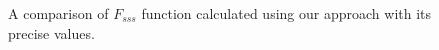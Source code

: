 \documentclass[reprint,amsmath,amssymb,aps,pre,showkeys,showpacs]{revtex4-1}
\begin{document}
\begin{figure}[tp]
{    \label{fig:sss-dumbbell-precise}}
  \hfill
  \caption[]{A comparison of $F_{sss}$ function calculated using our approach
    with its precise values.}
  \label{fig:sss-verification}
\end{figure}
\end{document}
